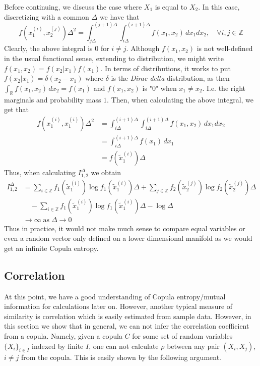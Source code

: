 \documentclass[../Thesis.tex]{subfiles}
\begin{document}
Before continuing, we discuss the case where $X_1$ is equal to $X_2$. In this case, discretizing with a common $\Delta$ we have that
$$f\left(x_1^{(i)}, x_2^{(j)}\right)\Delta^2 = \int_{j\Delta}^{(j+1)\Delta}\int_{i\Delta}^{(i+1)\Delta} f(x_1,x_2) \, dx_1 dx_2,\quad \forall i,j\in\mathbb{Z}$$
Clearly, the above integral is $0$ for $i\neq j$. Although $f(x_1,x_2)$ is not well-defined in the usual functional sense, extending to distribution, we might write $f(x_1,x_2) = f(x_2 | x_1) f(x_1)$. In terms of distributions, it works to put $f(x_2 | x_1) = \delta(x_2 - x_1)$ where $\delta$ is the \textit{Dirac delta} distribution, as then $\int_{\mathbb{R}} f(x_1,x_2) \, dx_2 = f(x_1)$ and $f(x_1, x_2)$ is "$0$" when $x_1 \neq x_2$. I.e. the right marginals and probability mass $1$. Then, when calculating the above integral, we get that
\begin{align*}
    f\left(x_1^{(i)}, x_1^{(i)}\right)\Delta^2 & = \int_{i\Delta}^{(i+1)\Delta}\int_{i\Delta}^{(i+1)\Delta} f(x_1,x_2) \, dx_1 dx_2 \\
                                               & = \int_{i\Delta}^{(i+1)\Delta} f\left(x_1\right)\, dx_1                            \\
                                               & = f\left(\tilde{x}_1^{(i)}\right)\Delta
\end{align*}
Thus, when calculating $I^{\Delta}_{1,2}$ we obtain
\begin{align*}
    I^{\Delta}_{1,2} & = \sum_{i\in\mathbb{Z}} f_1\left(\tilde{x}_1^{(i)}\right) \log{f_1\left(\tilde{x}_1^{(i)}\right)}\Delta + \sum_{j\in\mathbb{Z}} f_2\left(\tilde{x}_2^{(j)}\right)  \log{f_2\left(\tilde{x}_2^{(j)}\right)}\Delta \\
                     & \quad - \sum_{i\in\mathbb{Z}} f_1\left(\tilde{x}_1^{(i)}\right) \log{f_1\left(\tilde{x}_1^{(i)}\right)}\Delta - \log \Delta                                                                                      \\
                     & \to \infty \;\text{as}\; \Delta \to 0
\end{align*}
Thus in practice, it would not make much sense to compare equal variables or even a random vector only defined on a lower dimensional manifold as we would get an infinite Copula entropy.





\subsection{Correlation}
At this point, we have a good understanding of Copula entropy/mutual information for calculations later on. However, another typical measure of similarity is correlation which is easily estimated from sample data. However, in this section we show that in general, we can not infer the correlation coefficient from a copula. Namely, given a copula $C$ for some set of random variables $\{X_i\}_{i\in I}$ indexed by finite $I$, one can not calculate $\rho$ between any pair $(X_i ,X_j)$, $i\neq j$ from the copula. This is easily shown by the following argument.
\end{document}
